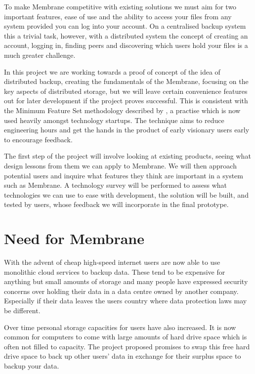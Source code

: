 \documentclass[11pt, a4paper, twocolumn, twoside]{report}
\begin{document}
To make Membrane competitive with existing solutions we must aim for two important features, ease of use and the ability to access your files from any system provided you can log into your account. On a centralised backup system this a trivial task, however, with a distributed system the concept of creating an account, logging in, finding peers and discovering which users hold your files is a much greater challenge.

In this project we are working towards a proof of concept of the idea of distributed backup, creating the fundamentals of the Membrane, focusing on the key aspects of distributed storage, but we will leave certain convenience features out for later development if the project proves successful. This is consistent with the Minimum Feature Set methodology described by \cite{blank2010mfs}, a practise which is now used heavily amongst technology startups. The technique aims to reduce engineering hours and get the hands in the product of early visionary users early to encourage feedback.

The first step of the project will involve looking at existing products, seeing what design lessons from them we can apply to Membrane. We will then approach potential users and inquire what features they think are important in a system such as Membrane. A technology survey will be performed to assess what technologies we can use to ease with development, the solution will be built, and tested by users, whose feedback we will incorporate in the final prototype.

\section{Need for Membrane}

With the advent of cheap high-speed internet users are now able to use monolithic cloud services to backup data. These tend to be expensive for anything but small amounts of storage and many people have expressed security concerns over holding their data in a data centre owned by another company. \citep{batters2010dbsecurity} Especially if their data leaves the users country where data protection laws may be different.

Over time personal storage capacities for users have also increased. It is now common for computers to come with large amounts of hard drive space which is often not filled to capacity. The project proposed promises to swap this free hard drive space to back up other users’ data in exchange for their surplus space to backup your data.
\end{document}
